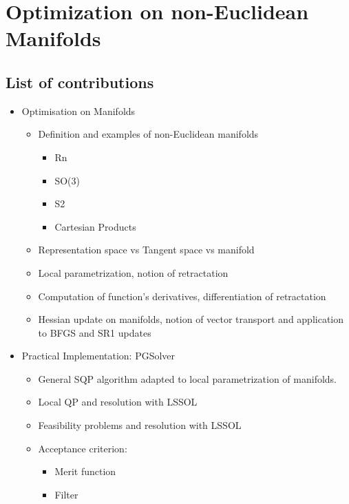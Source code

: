 

\chapter{
Optimization on non-Euclidean Manifolds
}
\section{List of contributions}
\begin{itemize}
  \item{Optimisation on Manifolds}
    \begin{itemize}
      \item Definition and examples of non-Euclidean manifolds
        \begin{itemize}
          \item Rn
          \item SO(3)
          \item S2
          \item Cartesian Products
        \end{itemize}
      \item Representation space vs Tangent space vs manifold
      \item Local parametrization, notion of retractation
      \item Computation of function's derivatives, differentiation of retractation
      \item Hessian update on manifolds, notion of vector transport and application to BFGS and SR1 updates
    \end{itemize}
  \item{Practical Implementation: PGSolver}
    \begin{itemize}
      \item General SQP algorithm adapted to local parametrization of manifolds.
      \item Local QP and resolution with LSSOL
      \item Feasibility problems and resolution with LSSOL
      \item Acceptance criterion:
        \begin{itemize}
          \item Merit function
          \item Filter

\end{itemize}
\end{itemize}
\end{itemize}
